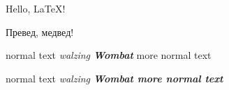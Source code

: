 \documentclass{article}
\begin{document}
Hello, \LaTeX{}!

Превед, медвед!

normal text {\itshape walzing \bfseries Wombat} more normal text

normal text \bgroup\itshape walzing \bfseries Wombat\egroup{} more normal text
\end{document}
